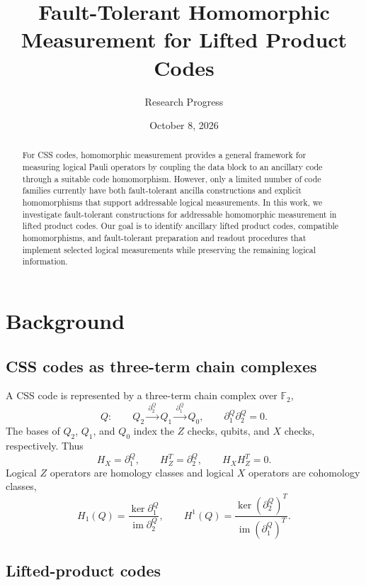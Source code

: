 \documentclass[11pt]{article}
\title{Fault-Tolerant Homomorphic Measurement for Lifted Product Codes}
\author{Research Progress}
\date{October 8, 2026}
\newcommand{\F}{\mathbb{F}}
\newcommand{\im}{\operatorname{im}}
\begin{document}
\maketitle

\begin{abstract}
For CSS codes, homomorphic measurement provides a general framework for
measuring logical Pauli operators by coupling the data block to an ancillary
code through a suitable code homomorphism. However, only a limited number of
code families currently have both fault-tolerant ancilla constructions and
explicit homomorphisms that support addressable logical measurements. In this
work, we investigate fault-tolerant constructions for addressable homomorphic
measurement in lifted product codes. Our goal is to identify ancillary lifted
product codes, compatible homomorphisms, and fault-tolerant preparation and
readout procedures that implement selected logical measurements while
preserving the remaining logical information.
\end{abstract}

\section{Background}

\subsection{CSS codes as three-term chain complexes}

A CSS code is represented by a three-term chain complex over $\F_2$,
\begin{equation}
  Q:\qquad
  Q_2 \xrightarrow{\,\partial_2^Q\,}
  Q_1 \xrightarrow{\,\partial_1^Q\,} Q_0,
  \qquad
  \partial_1^Q\partial_2^Q=0.
  \label{eq:css-complex}
\end{equation}
The bases of $Q_2$, $Q_1$, and $Q_0$ index the $Z$ checks, qubits, and $X$
checks, respectively. Thus
\begin{equation}
  H_X=\partial_1^Q,
  \qquad
  H_Z^T=\partial_2^Q,
  \qquad
  H_XH_Z^T=0.
  \label{eq:css-checks}
\end{equation}
Logical $Z$ operators are homology classes and logical $X$ operators are
cohomology classes,
\begin{equation}
  H_1(Q)=\frac{\ker\partial_1^Q}{\im\partial_2^Q},
  \qquad
  H^1(Q)=
  \frac{\ker(\partial_2^Q)^T}{\im(\partial_1^Q)^T}.
  \label{eq:logical-homology}
\end{equation}
\subsection{Lifted-product codes}
\end{document}
